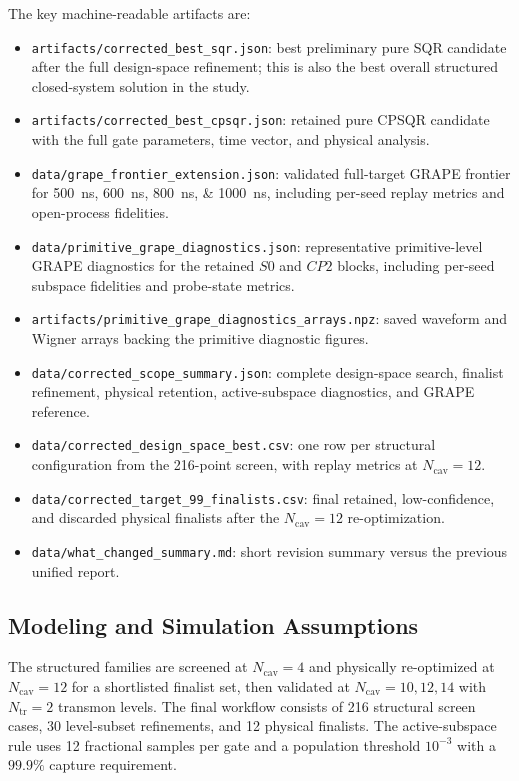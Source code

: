 ﻿\documentclass[aps,pra,twocolumn,reprint,amsmath,amssymb,floatfix]{revtex4-2}
\begin{document}
The key machine-readable artifacts are:
\begin{itemize}
  \item \texttt{artifacts/corrected\_best\_sqr.json}: best preliminary pure
  SQR candidate after the full design-space refinement; this is also the best
  overall structured closed-system solution in the study.
  \item \texttt{artifacts/corrected\_best\_cpsqr.json}: retained pure CPSQR
  candidate with the full gate parameters, time vector, and physical analysis.
  \item \texttt{data/grape\_frontier\_extension.json}: validated full-target
  GRAPE frontier for \SIlist{500;600;800;1000}{ns}, including per-seed replay
  metrics and open-process fidelities.
  \item \texttt{data/primitive\_grape\_diagnostics.json}: representative
  primitive-level GRAPE diagnostics for the retained $S0$ and $CP2$ blocks,
  including per-seed subspace fidelities and probe-state metrics.
  \item \texttt{artifacts/primitive\_grape\_diagnostics\_arrays.npz}: saved
  waveform and Wigner arrays backing the primitive diagnostic figures.
  \item \texttt{data/corrected\_scope\_summary.json}: complete design-space
  search, finalist refinement, physical retention, active-subspace diagnostics,
  and GRAPE reference.
  \item \texttt{data/corrected\_design\_space\_best.csv}: one row per
  structural configuration from the 216-point screen, with replay metrics at
  $N_{\mathrm{cav}}=12$.
  \item \texttt{data/corrected\_target\_99\_finalists.csv}: final retained,
  low-confidence, and discarded physical finalists after the $N_{\mathrm{cav}}=12$
  re-optimization.
  \item \texttt{data/what\_changed\_summary.md}: short revision summary versus
  the previous unified report.
\end{itemize}

\subsection{Modeling and Simulation Assumptions}

The structured families are screened at $N_{\mathrm{cav}}=4$ and physically
re-optimized at $N_{\mathrm{cav}}=12$ for a shortlisted finalist set, then
validated at $N_{\mathrm{cav}}=10,12,14$ with $N_{\mathrm{tr}}=2$ transmon
levels. The final workflow consists of 216 structural screen cases, 30
level-subset refinements, and 12 physical finalists. The active-subspace rule
uses 12 fractional samples per gate and a population threshold $10^{-3}$ with a
$99.9\%$ capture requirement.
\end{document}
